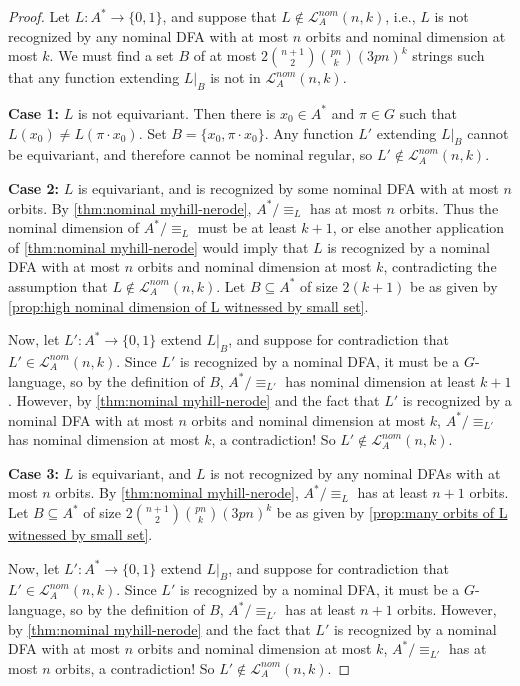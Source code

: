 \documentclass[runningheads]{llncs}
\newcommand{\mc}{\mathcal}
\begin{document}
\begin{proof}
    Let $L : A^* \to \{0,1\}$, and suppose that $L \notin \mc L^{nom}_A(n,k)$, i.e., $L$ is not recognized by any nominal DFA with at most $n$ orbits and nominal dimension at most $k$.
    We must find a set $B$ of at most $2 \binom{n+1}{2} \binom{pn}{k} (3pn)^k$ strings such that any function extending $L|_B$ is not in $\mc L^{nom}_A(n,k)$.

    \textbf{Case 1:} $L$ is not equivariant.
    Then there is $x_0 \in A^*$ and $\pi \in G$ such that $L(x_0) \neq L(\pi \cdot x_0)$.
    Set $B = \{x_0, \pi \cdot x_0\}$.
    Any function $L'$ extending $L|_B$ cannot be equivariant, and therefore cannot be nominal regular, so $L' \notin \mc L^{nom}_A(n,k)$. 

    \textbf{Case 2:} $L$ is equivariant, and is recognized by some nominal DFA with at most $n$ orbits. 
    By \autoref{thm:nominal myhill-nerode}, $A^* / \equiv_L$ has at most $n$ orbits. 
    Thus the nominal dimension of $A^* / \equiv_L$ must be at least $k+1$, or else another application of \autoref{thm:nominal myhill-nerode} would imply that $L$ is recognized by a nominal DFA with at most $n$ orbits and nominal dimension at most $k$, contradicting the assumption that $L \notin \mc L^{nom}_A(n,k)$. 
    Let $B \subseteq A^*$ of size $2(k+1)$ be as given by \autoref{prop:high nominal dimension of L witnessed by small set}.
    
    Now, let $L' : A^* \to \{0,1\}$ extend $L|_B$, and suppose for contradiction that $L' \in \mc L^{nom}_A(n,k)$. 
    Since $L'$ is recognized by a nominal DFA, it must be a $G$-language, so by the definition of $B$, $A^* / \equiv_{L'}$ has nominal dimension at least $k+1$.
    However, by \autoref{thm:nominal myhill-nerode} and the fact that $L'$ is recognized by a nominal DFA with at most $n$ orbits and nominal dimension at most $k$, $A^* / \equiv_{L'}$ has nominal dimension at most $k$, a contradiction!
    So $L' \notin \mc L^{nom}_A(n,k)$.

    \textbf{Case 3:} $L$ is equivariant, and $L$ is not recognized by any nominal DFAs with at most $n$ orbits.
    By \autoref{thm:nominal myhill-nerode}, $A^* / \equiv_L$ has at least $n+1$ orbits.
    Let $B \subseteq A^*$ of size $2 \binom{n+1}{2} \binom{pn}{k} (3pn)^k$ be as given by \autoref{prop:many orbits of L witnessed by small set}.

    Now, let $L' : A^* \to \{0,1\}$ extend $L|_B$, and suppose for contradiction that $L' \in \mc L^{nom}_A(n,k)$. 
    Since $L'$ is recognized by a nominal DFA, it must be a $G$-language, so by the definition of $B$, $A^* / \equiv_{L'}$ has at least $n+1$ orbits.
    However, by \autoref{thm:nominal myhill-nerode} and the fact that $L'$ is recognized by a nominal DFA with at most $n$ orbits and nominal dimension at most $k$, $A^* / \equiv_{L'}$ has at most $n$ orbits, a contradiction!
    So $L' \notin \mc L^{nom}_A(n,k)$.
    

\end{proof}
\end{document}

